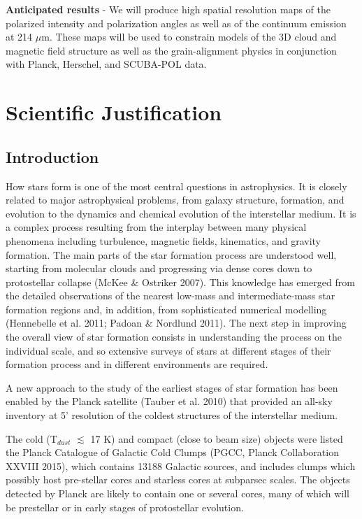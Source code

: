 \documentclass[11pt]{amsart}
\begin{document}
{\bf Anticipated results} - We will produce high spatial resolution maps of the polarized intensity and polarization angles as well as of the 
continuum emission at 214 $\mu$m. 
These maps will be used to constrain models of the 3D cloud and magnetic field structure as well as the grain-alignment physics in conjunction
with Planck, Herschel, and SCUBA-POL data.

\newpage

\section{Scientific Justification}


\subsection{Introduction}

How stars form is one of the most central questions in astrophysics.
It is closely related to major astrophysical problems,
from galaxy structure, formation, and evolution to the dynamics
and chemical evolution of the interstellar medium. It is a complex
process resulting from the interplay between many physical
phenomena including turbulence, magnetic fields, kinematics,
and gravity formation. 
The main parts of the star formation process are understood well, starting from molecular
clouds and progressing via dense cores down to protostellar
collapse (McKee \& Ostriker 2007). This knowledge has
emerged from the detailed observations of the nearest low-mass
and intermediate-mass star formation regions and, in addition,
from sophisticated numerical modelling (Hennebelle et al. 2011;
Padoan \& Nordlund 2011). The next step in improving the overall
view of star formation consists in understanding the process
on the individual scale, and so extensive surveys of stars at different
stages of their formation process and in different environments
are required.

A new approach to the study of the earliest stages of star formation
has been enabled by the Planck satellite (Tauber et al.
2010) that provided
an all-sky inventory at 5' resolution
of the coldest structures of the interstellar
medium. 

The cold (T$_{dust}$ $\lesssim$ 17 K) and compact (close to beam
size) objects were listed the Planck Catalogue of Galactic Cold Clumps (PGCC, Planck
Collaboration XXVIII 2015), which contains 13188 Galactic
sources, and 
includes clumps
which possibly host pre-stellar cores and starless cores at subparsec
scales. 
The objects detected by Planck are
likely to contain one or several cores, many of which will be prestellar
or in early stages of protostellar evolution. 
\end{document}
